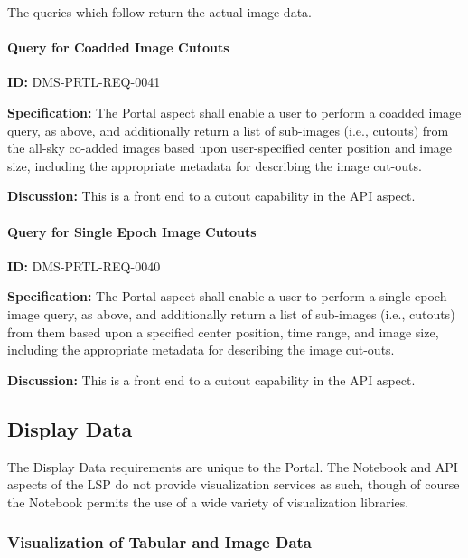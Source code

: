 \documentclass[SE,toc,lsstdraft]{lsstdoc}
\begin{document}
The queries which follow return the actual image data.

\paragraph{Query for Coadded Image Cutouts}\hfill  %

\label{DMS-PRTL-REQ-0041}
\textbf{ID:} DMS-PRTL-REQ-0041

\textbf{Specification:}
The Portal aspect shall enable a user to perform a coadded image query, as above, and additionally return a list of sub-images (i.e., cutouts) from the all-sky co-added images based upon user-specified center position and image size, including the appropriate metadata for describing the image cut-outs.

\textbf{Discussion:}
This is a front end to a cutout capability in the API aspect.

\paragraph{Query for Single Epoch Image Cutouts}\hfill  %

\label{DMS-PRTL-REQ-0040}
\textbf{ID:} DMS-PRTL-REQ-0040

\textbf{Specification:}
The Portal aspect shall enable a user to perform a single-epoch image query, as above, and additionally return a list of sub-images (i.e., cutouts) from them based upon a specified center position, time range, and image size, including the appropriate metadata for describing the image cut-outs.

\textbf{Discussion:}
This is a front end to a cutout capability in the API aspect.

\subsection{Display Data}

The Display Data requirements are unique to the Portal.  The Notebook and API aspects of the LSP do not provide visualization services as such, though of course the Notebook permits the use of a wide variety of visualization libraries.

\subsubsection{Visualization of Tabular and Image Data}
\end{document}
